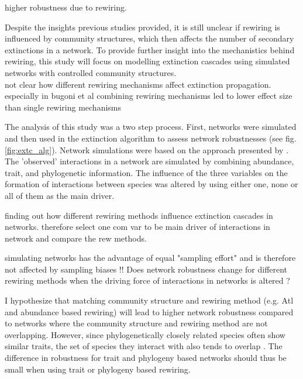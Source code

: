 \documentclass[12pt,a4paper]{article}
\begin{document}
\parencite{Kaiser-Bunbury2010, Schleuning2016, Timoteo2016, Costa2018} higher robustness due to rewiring. %


Despite the insights previous studies provided, it is still unclear if rewiring is influenced by community structures, which then affects the number of secondary extinctions in a network. To provide further insight into the mechanistics behind rewiring, this study will focus on modelling extinction cascades using simulated networks with controlled community structures. \\

	not clear how different rewiring mechanisms affect extinction propagation. especially in bugoni et al combining rewiring mechanisms led to lower effect size than single rewiring mechanisms

The analysis of this study was a two step process. First, networks were simulated and then used in the extinction algorithm to assess network robustnesses (see fig. \ref{fig:extc_alg}).  
Network simulations were based on the approach presented by \citeauthor{Benadi} \parencite{Benadi}. The 'observed' interactions in a network are simulated by combining abundance, trait, and phylogenetic information. The influence of the three variables on the formation of interactions between species was altered by using either one, none or all of them as the main driver.

	finding out how different rewiring methods influence extinction cascades in networks. therefore select one com var to be main driver of interactions in network and compare the rew methods. 
	
	simulating networks has the advantage of equal "sampling effort" and is therefore not affected by sampling biases !!
Does network robustness change for different rewiring methods when the driving force of interactions in networks is altered ?

I hypothesize that matching community structure and rewiring method (e.g. Atl and abundance based rewiring) will lead to higher network robustness compared to networks where the community structure and rewiring method are not overlapping. However, since phylogenetically closely related species often show similar traits, the set of species they interact with also tends to overlap \parencite{Gomez2010, Rezende2007}. The difference in robustness for trait and phylogeny based networks should thus be small when using trait or phylogeny based rewiring. 
\newpage
\end{document}
